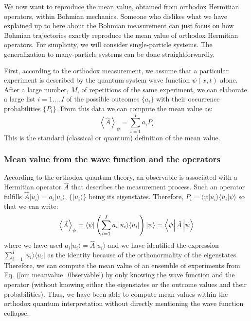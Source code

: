 \documentclass[nofootinbib, secnumarabic, amsmath, nobibnotes,11pt,aps,pra, floatfix]{revtex4-1}
\newcommand{\ket}[1]{\ensuremath{|#1\rangle}}
\newcommand{\bra}[1]{\ensuremath{\langle#1|}}
\newcommand{\braket}[2]{\langle#1|#2\rangle}
\newcommand{\eref}[1]{Eq. (\ref{#1})}
\newcommand{\avg}[1]{\left\langle #1 \right\rangle} %
\newcommand{\matrixel}[3]{\left\langle #1 \vphantom{#2#3} \right|
#2 \left| #3 \vphantom{#1#2} \right\rangle} %
\begin{document}
We now want to reproduce the mean value, obtained from orthodox Hermitian
operators, within Bohmian mechanics. Someone who dislikes what we
have explained up to here about the Bohmian measurement can just
focus on how Bohmian trajectories exactly reproduce the mean value of orthodox
Hermitian operators. For simplicity, we will consider
single-particle systems. The generalization to many-particle systems
can be done straightforwardly.

First, according to the orthodox measurement, we assume that a particular experiment is described by the quantum system wave function $\psi(x,t)$ alone. After a large number, $M$, of repetitions of the same experiment, we can elaborate a large list $i = 1\ldots,I$ of the possible outcomes $\{a_i\}$ with their occurrence probabilities $\{P_i\}$. From this data we can compute the mean value as:
 \begin{equation}
 \label{om.meanvalue_probability}
 \avg{\hat{A}}_{\psi} = \sum_{i = 1}^{I}a_i P_i
 \end{equation}
This is the standard (classical or quantum) definition of the mean value.

\subsubsection{Mean value from the wave function and the operators}

According to the orthodox quantum theory, an observable is associated with a Hermitian operator $\hat{A}$ that describes the measurement process.
Such an operator fulfills $\hat{A} \ket{u_i} = a_i\ket{u_i}$, $\{\ket{u_i}\}$ being its eigenstates.
Therefore, $P_i = \braket{\psi}{u_i}\braket{u_i}{\psi}$ so that we can write:
 \begin{equation}
 \label{om.meanvalue_0bservable}
 \avg{\hat{A}}_{\psi} = \bra{\psi} \left( \sum_{i = 1}^{I}a_i \ket{u_i}\bra{u_i} \right) \ket{\psi} = \matrixel{\psi}{\hat{A}}{\psi}
\end{equation}
where we have used $a_i\ket{u_i} = \hat{A} \ket{u_i}$ and we have
identified the expression $\sum_{i = 1}^{I} \ket{u_i}\bra{u_i}$ as
the identity because of the orthonormality of the eigenstates.
Therefore, we can compute the mean value of an ensemble of
experiments from \eref{om.meanvalue_0bservable} by only knowing the
wave function and the operator (without knowing either the
eigenstates or the outcome values and their probabilities).  Thus, we have been able to compute
mean values within the orthodox quantum interpretation without
directly mentioning the wave function collapse.
\end{document}

